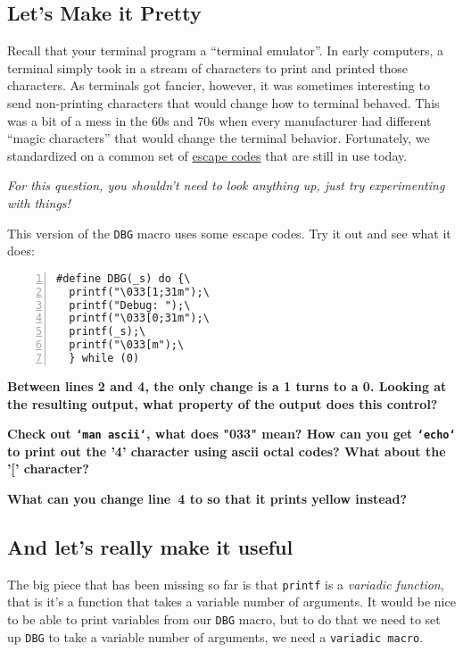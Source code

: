 \documentclass{article}
\begin{document}
\newpage

\subsection{Let's Make it Pretty}

Recall that your terminal program a ``terminal emulator''. In early computers,
a terminal simply took in a stream of characters to print and printed those
characters. As terminals got fancier, however, it was sometimes interesting to
send non-printing characters that would change how to terminal behaved. This
was a bit of a mess in the 60s and 70s when every manufacturer had different
``magic characters'' that would change the terminal behavior. Fortunately, we
standardized on a common set of
\href{https://en.wikipedia.org/wiki/ANSI_escape_code}{escape codes} that are
still in use today.

\emph{For this question, you shouldn't need to look anything up, just try
  experimenting with things!}

This version of the \texttt{DBG} macro uses some escape codes. Try it out and
see what it does:

\begin{lstlisting}[numbers=left]
#define DBG(_s) do {\
  printf("\033[1;31m");\
  printf("Debug: ");\
  printf("\033[0;31m");\
  printf(_s);\
  printf("\033[m");\
  } while (0)
\end{lstlisting}

\textbf{Between lines 2 and 4, the only change is a 1 turns to a 0.
  Looking at the resulting output, what property of the output does this control?}
\vspace{2cm}

\textbf{Check out \texttt{`man ascii`}, what does "033" mean? How can you get
\texttt{`echo`} to print out the '4' character using ascii octal codes? What about the '[' character?}
\vspace{2cm}

\textbf{What can you change line~4 to so that it prints yellow instead?}



\newpage
\subsection{And let's really make it useful}

The big piece that has been missing so far is that \texttt{printf} is a
\emph{variadic function}, that is it's a function that takes a variable
number of arguments. It would be nice to be able to print variables from our
\texttt{DBG} macro, but to do that we need to set up \texttt{DBG} to take a
variable number of arguments, we need a \texttt{variadic macro}.
\end{document}
